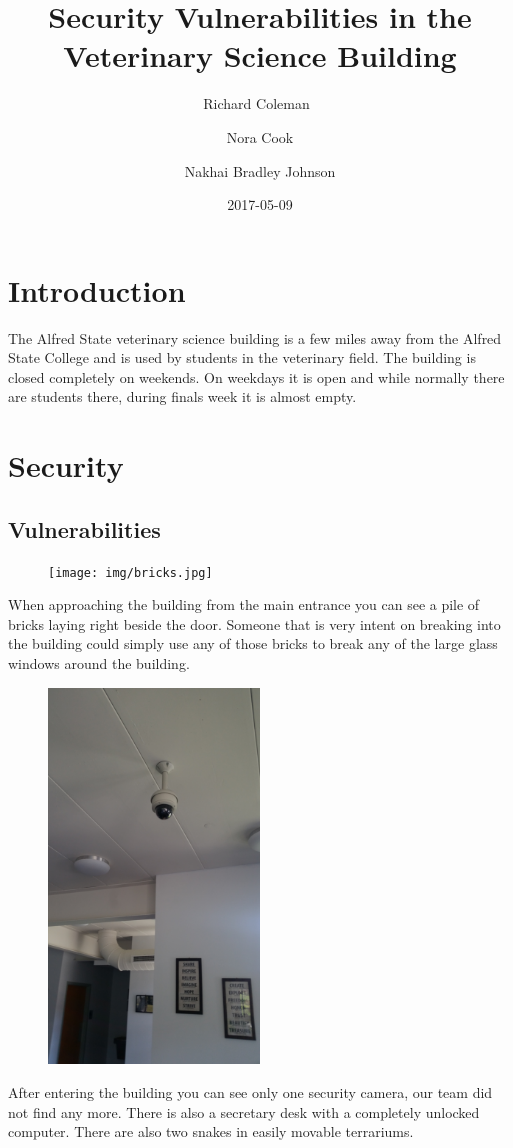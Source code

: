 \documentclass[12pt]{article}
\title{Security Vulnerabilities in the Veterinary Science Building}
\date{2017-05-09}
\author{Richard Coleman\
        \and
        Nora Cook
        \and
        Nakhai Bradley Johnson
        }
\begin{document}
        \maketitle
        \newpage
\section{Introduction}
        The Alfred State veterinary science building is a few miles away from the 
        Alfred State College and is used by students in the veterinary field. The
        building is closed completely on weekends. On weekdays it is open and while
        normally there are students there, during finals week it is almost empty.

\section{Security}
        \subsection{Vulnerabilities}
        
        \begin{figure}
        \centering
        \texttt{[image: img/bricks.jpg]}
        \end{figure}

        When approaching the building from the main entrance you can see a pile of 
        bricks laying right beside the door. Someone that is very intent on breaking
        into the building could simply use any of those bricks to break any of the 
        large glass windows around the building.
        
        \begin{figure}
        \centering
        \includegraphics[width=0.5\textwidth, height=0.25\textwidth, angle=270]{img/camera.jpg}
        \end{figure}

        After entering the building you can see only one security camera, our team
        did not find any more. There is also a secretary desk with a completely 
        unlocked computer. There are also two snakes in easily movable terrariums.
\end{document}
